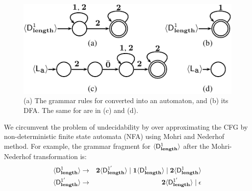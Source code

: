 \documentclass[9pt,preprint,nonatbib]{sigplanconf}
\begin{document}
\begin{figure}[t!]
\includegraphics[width=\columnwidth]{grammar-example.pdf}
\caption{(a) The  grammar rules for 
  converted into an automaton, and (b) its DFA. The same for \var{\Lanv{\pa}{}}
  are in (c) and (d).}\label{fig:example-automata}
\figrule
\end{figure}



We circumvent the problem of undecidability by over approximating the
CFG by non-deterministic finite state automata (NFA) using
Mohri  and Nederhof~\cite{mohri00regular} method.
For example, the grammar fragment for %
$\langle \mathsf{D}_{\mathit {\mathbf{length}}}^{1}\rangle$ after the Mohri-Nederhof transformation is:
 \begin{eqnarray*}
   \langle \mathsf{D}_{\mathit {\mathbf{length}}}^{1}\rangle &\rightarrow& {\mathbf{2}}\langle \mathsf{D}_{\mathit {\mathbf{length}}}^{1'}\rangle \mid
   \mathbf{1}\langle \mathsf{D}_{\mathit {\mathbf{length}}}^{1}\rangle
   \mid {\mathbf{2}}\langle \mathsf{D}_{\mathit {\mathbf{length}}}^{1}\rangle\\
   \langle \mathsf{D}_{\mathit {\mathbf{length}}}^{1'}\rangle &\rightarrow& {\mathbf{2}}\langle \mathsf{D}_{\mathit {\mathbf{length}}}^{1'}\rangle
   \mid \epsilon
 \end{eqnarray*}
\end{document}
